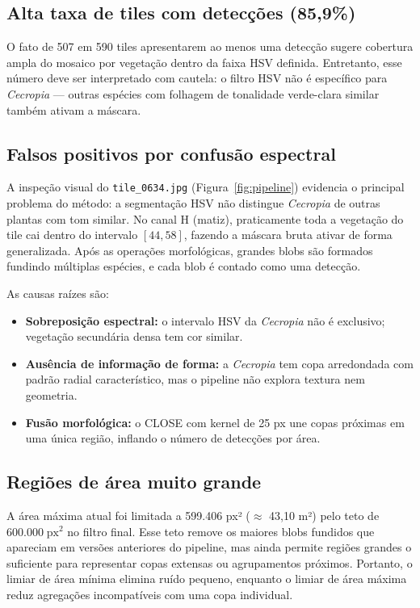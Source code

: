 \documentclass[12pt, a4paper]{article}
\begin{document}
\subsection{Alta taxa de tiles com detecções (85,9\%)}

O fato de 507 em 590 tiles apresentarem ao menos uma detecção sugere cobertura
ampla do mosaico por vegetação dentro da faixa HSV definida. Entretanto, esse
número deve ser interpretado com cautela: o filtro HSV não é específico para
\textit{Cecropia} — outras espécies com folhagem de tonalidade verde-clara
similar também ativam a máscara.

\subsection{Falsos positivos por confusão espectral}

A inspeção visual do \texttt{tile\_0634.jpg} (Figura~\ref{fig:pipeline})
evidencia o principal problema do método: a segmentação HSV não distingue
\textit{Cecropia} de outras plantas com tom similar. No canal H (matiz),
praticamente toda a vegetação do tile cai dentro do intervalo $[44, 58]$,
fazendo a máscara bruta ativar de forma generalizada. Após as operações
morfológicas, grandes blobs são formados fundindo múltiplas espécies, e cada
blob é contado como uma detecção.

As causas raízes são:

\begin{itemize}
    \item \textbf{Sobreposição espectral:} o intervalo HSV da \textit{Cecropia}
    não é exclusivo; vegetação secundária densa tem cor similar.
    \item \textbf{Ausência de informação de forma:} a \textit{Cecropia} tem copa
    arredondada com padrão radial característico, mas o pipeline não explora
    textura nem geometria.
    \item \textbf{Fusão morfológica:} o CLOSE com kernel de 25 px une copas
    próximas em uma única região, inflando o número de detecções por área.
\end{itemize}

\subsection{Regiões de área muito grande}

A área máxima atual foi limitada a 599.406 px² ($\approx$ 43,10 m²) pelo teto de
$600.000\;\text{px}^2$ no filtro final. Esse teto remove os maiores blobs
fundidos que apareciam em versões anteriores do pipeline, mas ainda permite
regiões grandes o suficiente para representar copas extensas ou agrupamentos
próximos. Portanto, o limiar de área mínima elimina ruído pequeno, enquanto o
limiar de área máxima reduz agregações incompatíveis com uma copa individual.
\end{document}
